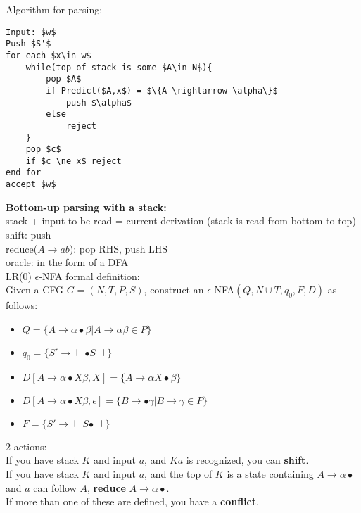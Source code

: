\documentclass[12pt]{article}
\begin{document}
\noindent
Algorithm for parsing:
\begin{lstlisting}[mathescape=true, showstringspaces=false]
Input: $w$
Push $S'$
for each $x\in w$
	while(top of stack is some $A\in N$){
		pop $A$
		if Predict($A,x$) = $\{A \rightarrow \alpha\}$
			push $\alpha$
		else
		    reject	
	}
	pop $c$
	if $c \ne x$ reject
end for
accept $w$
\end{lstlisting}
\noindent
\textbf{Bottom-up parsing with a stack:}\\
stack + input to be read = current derivation (stack is read from bottom to top)\\
shift: push\\
reduce($A\rightarrow ab$): pop RHS, push LHS\\
oracle: in the form of a DFA\\

\noindent
LR(0) $\epsilon$-NFA formal definition:\\
Given a CFG $G = (N, T, P, S)$, construct an $ \epsilon$-NFA$(Q, N\cup T, q_0, F, D)$ as follows:
\begin{itemize}
	\renewcommand\labelitemi{--}
	\item $Q = \{A \rightarrow \alpha \bullet \beta | A \rightarrow \alpha\beta\in P \}$
	\item $q_0 = \{S' \rightarrow \vdash \bullet S \dashv  \}$
	\item $D[A\rightarrow \alpha \bullet X\beta, X] = \{A \rightarrow \alpha X\bullet \beta \}$
	\item $D[A\rightarrow \alpha \bullet X\beta, \epsilon] = \{B \rightarrow \bullet\gamma|B\rightarrow\gamma\in P \}$
	\item $F = \{S' \rightarrow \vdash S \bullet \dashv \}$
\end{itemize}
2 actions:\\
If you have stack $K$ and input $a$, and $Ka$ is recognized, you can \textbf{shift}.\\
If you have stack $K$ and input $a$, and the top of $K$ is a state containing $A \rightarrow \alpha\bullet$ and $a$ can follow $A$, \textbf{reduce} $A\rightarrow\alpha\bullet$.\\
If more than one of these are defined, you have a \textbf{conflict}.\\
\end{document}
